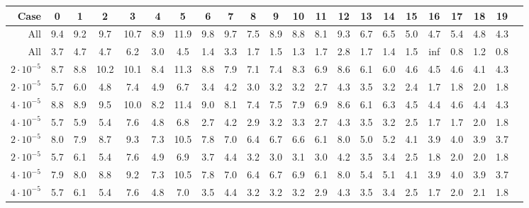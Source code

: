 \begin{table}
	\begin{tabular}{|r||c|c|c|c|c|c|c|c|c|c|c|c|c|c|c|c|c|c|c|c|c|}
		\hline
	Case& 0 & 1 & 2 & 3 & 4 & 5 & 6 & 7 & 8 & 9 & 10 & 11 & 12 & 13 & 14 & 15 & 16 & 17 & 18 & 19 \\\hline\hline
All & 9.4 &9.2 &9.7 &10.7 &8.9 &11.9 &9.8 &9.7 &7.5 &8.9 &8.8 &8.1 &9.3 &6.7 &6.5 &5.0 &4.7 &5.4 &4.8 &4.3  \\\hline
All & 3.7 &4.7 &4.7 &6.2 &3.0 &4.5 &1.4 &3.3 &1.7 &1.5 &1.3 &1.7 &2.8 &1.7 &1.4 &1.5 &inf &0.8 &1.2 &0.8  \\\hline\hline

$2\cdot10^{-5}$&8.7 &8.8 &10.2 &10.1 &8.4 &11.3 &8.8 &7.9 &7.1 &7.4 &8.3 &6.9 &8.6 &6.1 &6.0 &4.6 &4.5 &4.6 &4.1 &4.3  \\\hline
$2\cdot10^{-5}$&5.7 &6.0 &4.8 &7.4 &4.9 &6.7 &3.4 &4.2 &3.0 &3.2 &3.2 &2.7 &4.3 &3.5 &3.2 &2.4 &1.7 &1.8 &2.0 &1.8  \\\hline\hline

$4\cdot10^{-5}$&8.8 &8.9 &9.5 &10.0 &8.2 &11.4 &9.0 &8.1 &7.4 &7.5 &7.9 &6.9 &8.6 &6.1 &6.3 &4.5 &4.4 &4.6 &4.4 &4.3  \\\hline
$4\cdot10^{-5}$&5.7 &5.9 &5.4 &7.6 &4.8 &6.8 &2.7 &4.2 &2.9 &3.2 &3.3 &2.7 &4.3 &3.5 &3.2 &2.5 &1.7 &1.7 &2.0 &1.8  \\\hline\hline

$2\cdot10^{-5}$&8.0 &7.9 &8.7 &9.3 &7.3 &10.5 &7.8 &7.0 &6.4 &6.7 &6.6 &6.1 &8.0 &5.0 &5.2 &4.1 &3.9 &4.0 &3.9 &3.7  \\\hline
$2\cdot10^{-5}$&5.7 &6.1 &5.4 &7.6 &4.9 &6.9 &3.7 &4.4 &3.2 &3.0 &3.1 &3.0 &4.2 &3.5 &3.4 &2.5 &1.8 &2.0 &2.0 &1.8  \\\hline\hline

$4\cdot10^{-5}$&7.9 &8.0 &8.8 &9.2 &7.3 &10.5 &7.8 &7.0 &6.4 &6.7 &6.9 &6.1 &8.0 &5.4 &5.1 &4.1 &3.9 &4.0 &3.9 &3.7  \\\hline
$4\cdot10^{-5}$&5.7 &6.1 &5.4 &7.6 &4.8 &7.0 &3.5 &4.4 &3.2 &3.2 &3.2 &2.9 &4.3 &3.5 &3.4 &2.5 &1.7 &2.0 &2.1 &1.8  \\\hline
	\end{tabular}
	
	

	
\end{table}